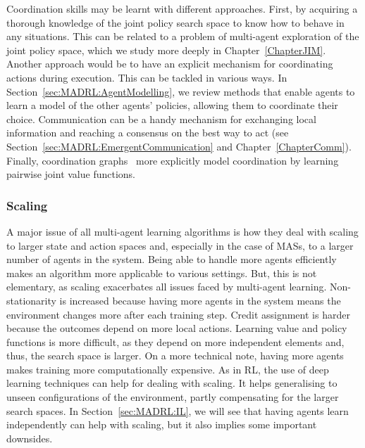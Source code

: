 Coordination skills may be learnt with different approaches. First, by acquiring a thorough knowledge of the joint policy search space to know how to behave in any situations. This can be related to a problem of multi-agent exploration of the joint policy space, which we study more deeply in Chapter~\ref{ChapterJIM}.
Another approach would be to have an explicit mechanism for coordinating actions during execution. This can be tackled in various ways. In Section~\ref{sec:MADRL:AgentModelling}, we review methods that enable agents to learn a model of the other agents' policies, allowing them to coordinate their choice. Communication can be a handy mechanism for exchanging local information and reaching a consensus on the best way to act (see Section~\ref{sec:MADRL:EmergentCommunication} and Chapter~\ref{ChapterComm}). Finally, coordination graphs~\citep{Guestrin2002_CoordGraphs, Bohmer2020_DeepCoordGraphs, Li2021_DeepImpCoordGraphs} more explicitly model coordination by learning pairwise joint value functions. 



\subsubsection{Scaling}\label{sec:MAL:Scaling}

A major issue of all multi-agent learning algorithms is how they deal with scaling to larger state and action spaces and, especially in the case of MASs, to a larger number of agents in the system. Being able to handle more agents efficiently makes an algorithm more applicable to various settings. But, this is not elementary, as scaling exacerbates all issues faced by multi-agent learning. Non-stationarity is increased because having more agents in the system means the environment changes more after each training step. Credit assignment is harder because the outcomes depend on more local actions. Learning value and policy functions is more difficult, as they depend on more independent elements and, thus, the search space is larger. On a more technical note, having more agents makes training more computationally expensive. As in RL, the use of deep learning techniques can help for dealing with scaling. It helps generalising to unseen configurations of the environment, partly compensating for the larger search spaces. In Section~\ref{sec:MADRL:IL}, we will see that having agents learn independently can help with scaling, but it also implies some important downsides. 




